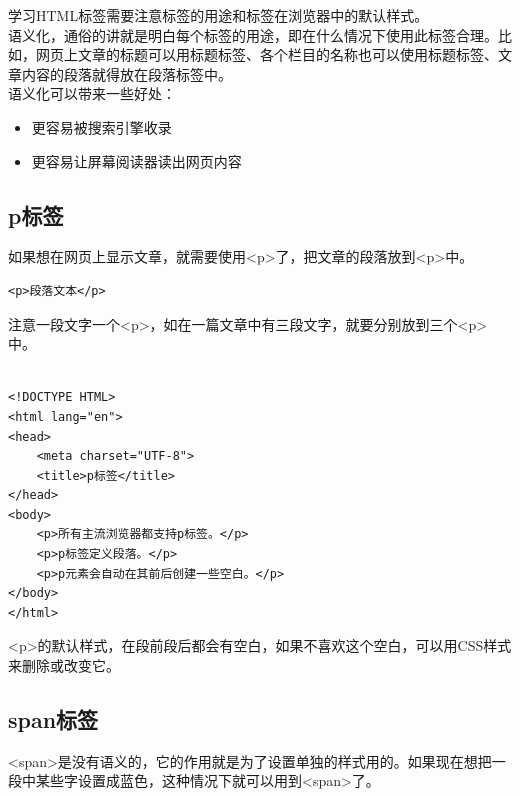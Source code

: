 学习HTML标签需要注意标签的用途和标签在浏览器中的默认样式。 \\

语义化，通俗的讲就是明白每个标签的用途，即在什么情况下使用此标签合理。比如，网页上文章的标题可以用标题标签、各个栏目的名称也可以使用标题标签、文章内容的段落就得放在段落标签中。 \\

语义化可以带来一些好处：

\begin{itemize}
	\item 更容易被搜索引擎收录
	\item 更容易让屏幕阅读器读出网页内容
\end{itemize}

\subsection{p标签}

如果想在网页上显示文章，就需要使用<p>了，把文章的段落放到<p>中。 \\

\begin{lstlisting}[style=htmlcssjs]
<p>段落文本</p>
\end{lstlisting}

注意一段文字一个<p>，如在一篇文章中有三段文字，就要分别放到三个<p>中。 \\

 \\

\begin{lstlisting}[style=htmlcssjs]
<!DOCTYPE HTML>
<html lang="en">
<head>
    <meta charset="UTF-8">
    <title>p标签</title>
</head>
<body>
    <p>所有主流浏览器都支持p标签。</p>
    <p>p标签定义段落。</p>
    <p>p元素会自动在其前后创建一些空白。</p>
</body>
</html>
\end{lstlisting}

<p>的默认样式，在段前段后都会有空白，如果不喜欢这个空白，可以用CSS样式来删除或改变它。

\subsection{span标签}

<span>是没有语义的，它的作用就是为了设置单独的样式用的。如果现在想把一段中某些字设置成蓝色，这种情况下就可以用到<span>了。 \\

 \\

